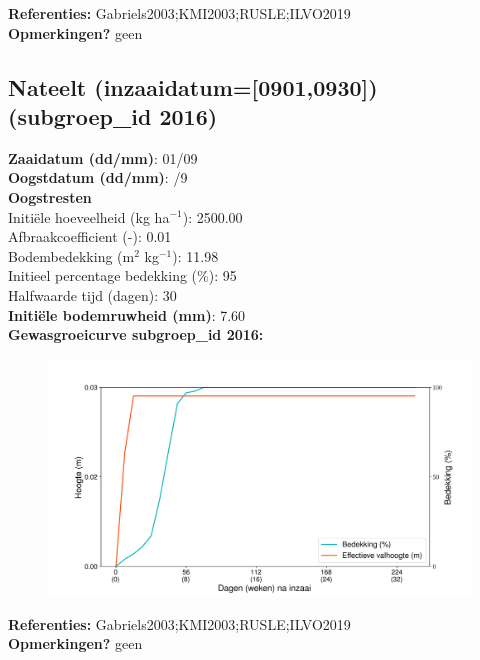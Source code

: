 \documentclass{article}
\begin{document}
  \textbf{Referenties:} Gabriels2003;KMI2003;RUSLE;ILVO2019 \vspace{0.10cm} \\ 
  \textbf{Opmerkingen?} geen \vspace{0.10cm} \\ 
 \newpage 
 \subsection{Nateelt (inzaaidatum=[0901,0930]) (subgroep\_id 2016)} 
  \textbf{Zaaidatum (dd/mm)}: 01/09  \vspace{0.10cm} \\ 
  \textbf{Oogstdatum (dd/mm)}: /9  \vspace{0.10cm} \\ 
  \textbf{Oogstresten} \vspace{0.05cm} \\ 
  \tab Initi\"{e}le hoeveelheid (kg ha$^{-1}$): 2500.00 \vspace{0.05cm} \\ 
  \tab Afbraakcoefficient (-): 0.01 \vspace{0.05cm} \\ 
  \tab Bodembedekking (m$^2$ kg$^{-1}$): 11.98 \vspace{0.05cm} \\ 
  \tab Initieel percentage bedekking (\%): 95 \vspace{0.05cm} \\ 
  \tab Halfwaarde tijd (dagen): 30 \vspace{0.05cm} \\ 
  \textbf{Initi\"{e}le bodemruwheid (mm)}: 7.60 \vspace{0.05cm} \\ 
  \textbf{Gewasgroeicurve subgroep\_id 2016:} 
 \begin{center} \begin{figure}[H] \includegraphics[width=12.5cm]{temp/2016.png} \end{figure} \end{center} 
  \textbf{Referenties:} Gabriels2003;KMI2003;RUSLE;ILVO2019 \vspace{0.10cm} \\ 
  \textbf{Opmerkingen?} geen \vspace{0.10cm} \\ 
 \newpage 
\end{document}
